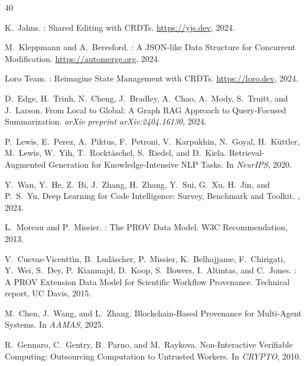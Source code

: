 \documentclass[sigchi-a]{acmart}
\begin{document}
\begin{thebibliography}{40}

K.~Jahns.
: Shared Editing with {CRDT}s.
\newblock \url{https://yjs.dev}, 2024.

M.~Kleppmann and A.~Beresford.
: A {JSON}-like Data Structure for Concurrent
  Modification.
\newblock \url{https://automerge.org}, 2024.

{Loro Team}.
: Reimagine State Management with {CRDT}s.
\newblock \url{https://loro.dev}, 2024.


D.~Edge, H.~Trinh, N.~Cheng, J.~Bradley, A.~Chao, A.~Mody, S.~Truitt,
  and J.~Larson.
\newblock From Local to Global: A Graph {RAG} Approach to Query-Focused
  Summarization.
\newblock \emph{arXiv preprint arXiv:2404.16130}, 2024.

P.~Lewis, E.~Perez, A.~Piktus, F.~Petroni, V.~Karpukhin, N.~Goyal,
  H.~K{\"u}ttler, M.~Lewis, W.~Yih, T.~Rockt{\"a}schel, S.~Riedel,
  and D.~Kiela.
\newblock Retrieval-Augmented Generation for Knowledge-Intensive {NLP} Tasks.
\newblock In \emph{NeurIPS}, 2020.

Y.~Wan, Y.~He, Z.~Bi, J.~Zhang, H.~Zhang, Y.~Sui, G.~Xu, H.~Jin, and P.~S.~Yu,
\newblock Deep Learning for Code Intelligence: Survey, Benchmark and Toolkit.
, 2024.


L.~Moreau and P.~Missier.
: The {PROV} Data Model.
\newblock W3C Recommendation, 2013.

V.~Cuevas-Vicentt{\'\i}n, B.~Lud{\"a}scher, P.~Missier, K.~Belhajjame,
  F.~Chirigati, Y.~Wei, S.~Dey, P.~Kianmajd, D.~Koop, S.~Bowers,
  I.~Altintas, and C.~Jones.
: A {PROV} Extension Data Model for Scientific Workflow
  Provenance.
\newblock Technical report, UC Davis, 2015.

M.~Chen, J.~Wang, and L.~Zhang.
\newblock Blockchain-Based Provenance for Multi-Agent Systems.
\newblock In \emph{AAMAS}, 2025.


R.~Gennaro, C.~Gentry, B.~Parno, and M.~Raykova.
\newblock Non-Interactive Verifiable Computing: Outsourcing Computation to
  Untrusted Workers.
\newblock In \emph{CRYPTO}, 2010.


\end{thebibliography}
\end{document}
